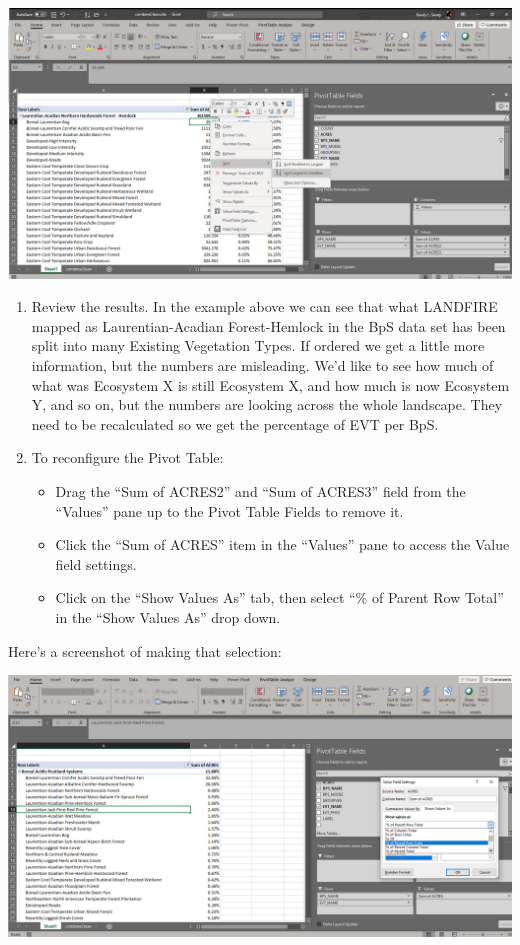 \documentclass[
]{book}
\providecommand{\tightlist}{%
  \setlength{\itemsep}{0pt}\setlength{\parskip}{0pt}}
\begin{document}
\includegraphics[width=1\linewidth]{pivotBpsEvt}

\begin{enumerate}
\def\labelenumi{\arabic{enumi}.}
\setcounter{enumi}{1}
\tightlist
\item
  Review the results. In the example above we can see that what LANDFIRE mapped as Laurentian-Acadian Forest-Hemlock in the BpS data set has been split into many Existing Vegetation Types. If ordered we get a little more information, but the numbers are misleading. We'd like to see how much of what was Ecosystem X is still Ecosystem X, and how much is now Ecosystem Y, and so on, but the numbers are looking across the whole landscape. They need to be recalculated so we get the percentage of EVT per BpS.
\item
  To reconfigure the Pivot Table:

  \begin{itemize}
  \tightlist
  \item
    Drag the ``Sum of ACRES2'' and ``Sum of ACRES3'' field from the ``Values'' pane up to the Pivot Table Fields to remove it.
  \item
    Click the ``Sum of ACRES'' item in the ``Values'' pane to access the Value field settings.
  \item
    Click on the ``Show Values As'' tab, then select ``\% of Parent Row Total'' in the ``Show Values As'' drop down.
  \end{itemize}
\end{enumerate}

Here's a screenshot of making that selection:

\includegraphics[width=1\linewidth]{pivotPercentParent}
\end{document}
